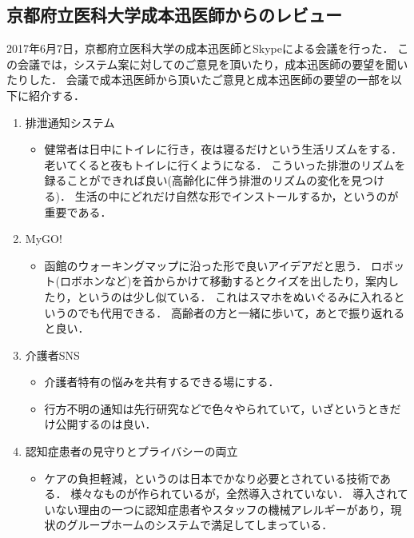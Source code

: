 \documentclass[../report]{subfiles}
\begin{document}
\subsection{京都府立医科大学成本迅医師からのレビュー}  \label{sec:4_hyouka_before3}
2017年6月7日，京都府立医科大学の成本迅医師とSkypeによる会議を行った．
この会議では，システム案に対してのご意見を頂いたり，成本迅医師の要望を聞いたりした．
会議で成本迅医師から頂いたご意見と成本迅医師の要望の一部を以下に紹介する．

\begin{enumerate}
    \item[] 排泄通知システム
\begin{itemize}
    \item 健常者は日中にトイレに行き，夜は寝るだけという生活リズムをする．
老いてくると夜もトイレに行くようになる．
こういった排泄のリズムを録ることができれば良い(高齢化に伴う排泄のリズムの変化を見つける)．
生活の中にどれだけ自然な形でインストールするか，というのが重要である．
\end{itemize}

    \item[] MyGO!
\begin{itemize}
    \item 函館のウォーキングマップに沿った形で良いアイデアだと思う．
ロボット(ロボホンなど)を首からかけて移動するとクイズを出したり，案内したり，というのは少し似ている．
これはスマホをぬいぐるみに入れるというのでも代用できる．
高齢者の方と一緒に歩いて，あとで振り返れると良い．
\end{itemize}

    \item[] 介護者SNS
\begin{itemize}
    \item 介護者特有の悩みを共有するできる場にする．
    \item 行方不明の通知は先行研究などで色々やられていて，いざというときだけ公開するのは良い．
\end{itemize}

    \item[] 認知症患者の見守りとプライバシーの両立
\begin{itemize}
    \item ケアの負担軽減，というのは日本でかなり必要とされている技術である．
様々なものが作られているが，全然導入されていない．
導入されていない理由の一つに認知症患者やスタッフの機械アレルギーがあり，現状のグループホームのシステムで満足してしまっている．
\end{itemize}


\end{enumerate}
\end{document}
